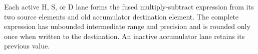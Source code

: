 Each active H, S, or D lane forms the fused multiply-subtract expression from
its two source elements and old accumulator destination element. The complete
expression has unbounded intermediate range and precision and is rounded only
once when written to the destination. An inactive accumulator lane retains
its previous value.
